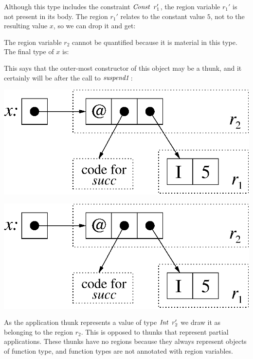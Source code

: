 Although this type includes the constraint $\operatorname{\mathit{Const}} \ r_1'$, the region variable $r_1'$ is not present in its body. The region $r_1'$ relates to the constant value $5$, not to the resulting value $x$, so we can drop it and get:


The region variable $r_2$ cannot be quantified because it is material in this type. The final type of $x$ is:


This says that the outer-most constructor of this object may be a thunk, and it certainly will be after the call to $\operatorname{\mathit{suspend1}}$:

\begin{center}
\includegraphics[scale=0.5]{2-System/fig/class-lazy}
\end{center}

\clearpage{}
\begin{center}
\includegraphics[scale=0.5]{2-System/fig/class-lazy}
\end{center}


As the application thunk represents a value of type $\operatorname{\mathit{Int}} \ r_2'$ we draw it as belonging to the region $r_2$. This is opposed to thunks that represent partial applications. These thunks have no regions because they always represent objects of function type, and function types are not annotated with region variables.

